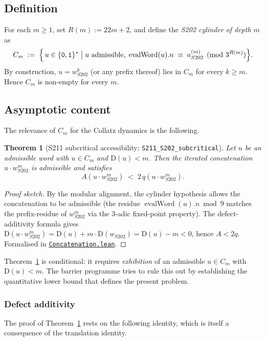 \documentclass[11pt,a4paper]{article}
\theoremstyle{plain}
\newtheorem{theorem}{Theorem}[section]
\theoremstyle{definition}
\newcommand{\aSat}{a_{S202}^{(m)}}
\newcommand{\wS}{w_{S202}}
\newcommand{\defect}{\mathrm{D}}
\DeclareMathOperator{\evalWord}{evalWord}
\begin{document}
\subsection{Definition}

For each $m \ge 1$, set $R(m) := 22m + 2$, and define the
\emph{S202 cylinder of depth $m$} as
\[
  C_m \;:=\;
  \Bigl\{ \, u \in \{\mathtt{0}, \mathtt{1}\}^* \;\big|\;
       u \text{ admissible}, \;
       \evalWord(u).n \;\equiv\; \aSat \pmod{3^{R(m)}}
  \Bigr\}.
\]
By construction, $u = \wS^k$ (or any prefix thereof) lies in $C_m$
for every $k \ge m$. Hence $C_m$ is non-empty for every $m$.

\subsection{Asymptotic content}

The relevance of $C_m$ for the Collatz dynamics is the following.

\begin{theorem}[S211 subcritical accessibility; \texttt{S211\_S202\_subcritical}]
\label{thm:s211-subcritical}
Let $u$ be an admissible word with $u \in C_m$ and $\defect(u) < m$.
Then the iterated concatenation $u \cdot \wS^m$ is admissible and
satisfies
\[
  A(u \cdot \wS^m) \;<\; 2 \, q(u \cdot \wS^m).
\]
\end{theorem}

\begin{proof}[Proof sketch]
By the modular alignment, the cylinder hypothesis allows the
concatenation to be admissible (the residue $\evalWord(u).n \bmod 9$
matches the prefix-residue of $\wS^m$ via the 3-adic fixed-point
property). The defect-additivity formula gives
$\defect(u \cdot \wS^m) = \defect(u) + m \cdot \defect(\wS) =
\defect(u) - m < 0$, hence $A < 2q$. Formalised in
\href{run:CollatzLean4/CollatzLean4/Concatenation.lean}%
{\texttt{Concatenation.lean}}.
\end{proof}

Theorem~\ref{thm:s211-subcritical} is conditional: it requires
\emph{exhibition} of an admissible $u \in C_m$ with $\defect(u) < m$.
The barrier programme tries to rule this out by establishing the
quantitative lower bound that defines the present problem.

\subsubsection*{Defect additivity}

The proof of Theorem~\ref{thm:s211-subcritical} rests on the
following identity, which is itself a consequence of the
translation identity.
\end{document}
